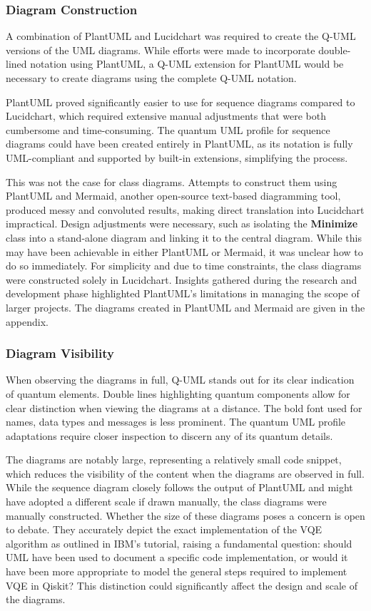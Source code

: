 \documentclass{article}
\begin{document}
\subsubsection{Diagram Construction}

A combination of PlantUML and Lucidchart was required to create the Q-UML versions of the UML diagrams. While efforts were made to incorporate double-lined notation using PlantUML, a Q-UML extension for PlantUML would be necessary to create diagrams using the complete Q-UML notation.

PlantUML proved significantly easier to use for sequence diagrams compared to Lucidchart, which required extensive manual adjustments that were both cumbersome and time-consuming. The quantum UML profile for sequence diagrams could have been created entirely in PlantUML, as its notation is fully UML-compliant and supported by built-in extensions, simplifying the process.

This was not the case for class diagrams. Attempts to construct them using PlantUML and Mermaid, another open-source text-based diagramming tool, produced messy and convoluted results, making direct translation into Lucidchart impractical. Design adjustments were necessary, such as isolating the \textbf{Minimize} class into a stand-alone diagram and linking it to the central diagram. While this may have been achievable in either PlantUML or Mermaid, it was unclear how to do so immediately. For simplicity and due to time constraints, the class diagrams were constructed solely in Lucidchart. Insights gathered during the research and development phase highlighted PlantUML's limitations in managing the scope of larger projects\cite{plantreddit}. The diagrams created in PlantUML and Mermaid are given in the appendix. 

\subsubsection{Diagram Visibility}

When observing the diagrams in full, Q-UML stands out for its clear indication of quantum elements. Double lines highlighting quantum components allow for clear distinction when viewing the diagrams at a distance. The bold font used for names, data types and messages is less prominent. The quantum UML profile adaptations require closer inspection to discern any of its quantum details.

The diagrams are notably large, representing a relatively small code snippet, which reduces the visibility of the content when the diagrams are observed in full. While the sequence diagram closely follows the output of PlantUML and might have adopted a different scale if drawn manually, the class diagrams were manually constructed. Whether the size of these diagrams poses a concern is open to debate. They accurately depict the exact implementation of the VQE algorithm as outlined in IBM's tutorial, raising a fundamental question: should UML have been used to document a specific code implementation, or would it have been more appropriate to model the general steps required to implement VQE in Qiskit? This distinction could significantly affect the design and scale of the diagrams.
\end{document}
